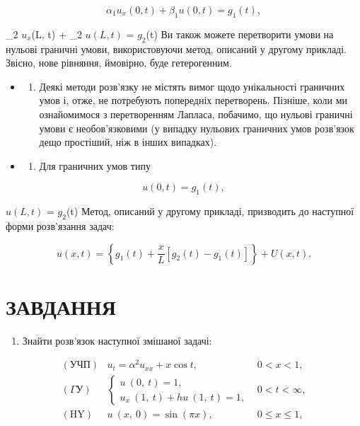 \documentclass[
  ukrainian,
]{article}
\providecommand{\tightlist}{%
  \setlength{\itemsep}{0pt}\setlength{\parskip}{0pt}}
\begin{document}
\[
\alpha_1 u_x(0, t) + \beta_1 u(0, t) = g_1(t),
\]

\alpha\_2 \(u_x\)(L, t) + \beta\_2 \(u(L, t)\) = \(g_2\)(t) Ви також
можете перетворити умови на нульові граничні умови, використовуючи
метод, описаний у другому прикладі. Звісно, нове рівняння, ймовірно,
буде гетерогенним.

\begin{itemize}
\tightlist
\item
  \begin{enumerate}
  \def\labelenumi{\arabic{enumi}.}
  \setcounter{enumi}{2}
  \tightlist
  \item
    Деякі методи розв'язку не містять вимог щодо унікальності граничних
    умов і, отже, не потребують попередніх перетворень. Пізніше, коли ми
    ознайомимося з перетворенням Лапласа, побачимо, що нульові граничні
    умови є необов'язковими (у випадку нульових граничних умов розв'язок
    дещо простіший, ніж в інших випадках).
  \end{enumerate}
\item
  \begin{enumerate}
  \def\labelenumi{\arabic{enumi}.}
  \setcounter{enumi}{3}
  \tightlist
  \item
    Для граничних умов типу
  \end{enumerate}
\end{itemize}

\[
u(0, t) = g_1(t),
\]

\(u(L, t)\) = \(g_2\)(t) Метод, описаний у другому прикладі, призводить
до наступної форми розв'язання задач:

\[
u(x, t) = \left\{ g_1(t) + \frac{x}{L} \left[ g_2(t) - g_1(t) \right] \right\} + U(x, t).
\]

\section{ЗАВДАННЯ}\label{ux437ux430ux432ux434ux430ux43dux43dux44f-4}

\begin{enumerate}
\def\labelenumi{\arabic{enumi}.}
\tightlist
\item
  Знайти розв'язок наступної змішаної задачі:
\end{enumerate}

\[
\begin{array}{lll} (\text{УЧП}) & u_t = \alpha^2 u_{xx} + x \cos t, & 0 < x < 1, \\ (\Gamma \text{У}) & \begin{cases} u \ (0, \ t) = 1, \\ u_x \ (1, \ t) + hu \ (1, \ t) = 1, \end{cases} & 0 < t < \infty, \\ (\text{HY}) & u \ (x, \ 0) = \sin (\pi x), & 0 \leqslant x \leqslant 1, \end{array}
\]
\end{document}
